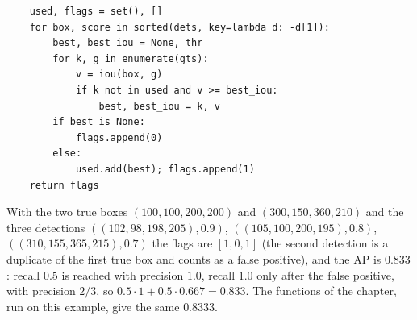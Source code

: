\begin{enumerate}[label=\textbf{\ansnum.\arabic*}]
\begin{verbatim}
    used, flags = set(), []
    for box, score in sorted(dets, key=lambda d: -d[1]):
        best, best_iou = None, thr
        for k, g in enumerate(gts):
            v = iou(box, g)
            if k not in used and v >= best_iou:
                best, best_iou = k, v
        if best is None:
            flags.append(0)
        else:
            used.add(best); flags.append(1)
    return flags
\end{verbatim}
  With the two true boxes $(100,100,200,200)$ and $(300,150,360,210)$ and the three detections $((102,98,198,205),0.9)$, $((105,100,200,195),0.8)$, $((310,155,365,215),0.7)$ the flags are $[1,0,1]$ (the second detection is a duplicate of the first true box and counts as a false positive), and the AP is $0.833$: recall $0.5$ is reached with precision $1.0$, recall $1.0$ only after the false positive, with precision $2/3$, so $0.5\cdot1+0.5\cdot0.667=0.833$. The functions of the chapter, run on this example, give the same $0.8333$.
\end{enumerate}
